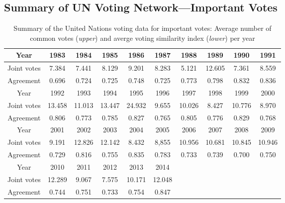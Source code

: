 \documentclass[a4paper]{article}
\begin{document}
\begin{appendices}
\section{Summary of UN Voting Network---Important Votes}\label{appendix: summarystat}
\begin{table}[ht]
	\centering
	\begin{tabular}{ |c|c|c|c|c|c|c|c|c|c|} 
		\hline
		{Year}	& 1983 & 1984& 1985& 1986 & 1987& 1988& 1989&1990&1991\\ \hline
		Joint votes & 7.384&7.441&8.129&9.201&8.283&5.121&12.605&7.361&8.559\\\hline
		Agreement & 0.696& 0.724& 0.725 & 0.748& 0.725& 0.773 & 0.798& 0.832& 0.836\\\hline\hline 
		{Year}	& 1992&1993& 1994 & 1995& 1996& 1997 & 1998& 1999& 2000\\ \hline
		Joint votes  &13.458&11.013&13.447&24.932&9.655&10.026&8.427&10.776&8.970\\\hline
	Agreement & 0.806&0.773& 0.785& 0.827& 0.765& 0.805& 0.776& 0.829 & 0.768\\\hline\hline
		{Year}	&2001&2002&2003&2004&2005& 2006& 2007& 2008&  2009\\ \hline
		Joint votes &9.191&12.826&12.142&8.432&8,855&10.956&10.681&10.845&10.946\\\hline
	Agreement &0.729& 0.816& 0.755& 0.835& 0.783& 0.733& 0.739&0.700&0.750\\		\hline\hline
		Year & 2010& 2011&2012&2013&2014&&&&\\\hline
		Joint votes&12.289&9.067&7.575&10.171&12.048&&&&\\\hline
	Agreement&  0.744& 0.751& 0.733&0.754&0.847&&&&\\\hline
	\end{tabular}
	\caption {Summary of the United Nations voting data for important votes: Average number of common votes (\textit{upper}) and averge voting similarity index (\textit{lower}) per year}
	\label{table:EDA}
\end{table}
\newpage

\end{appendices}
\end{document}
